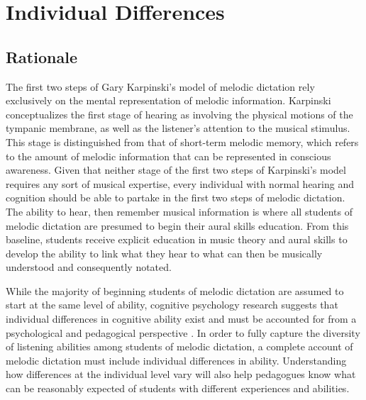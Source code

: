 \documentclass[12pt,]{book}
\begin{document}
\let\cleardoublepage\clearpage

\hypertarget{individual-differences}{%
\chapter{Individual Differences}\label{individual-differences}}

\hypertarget{rationale-1}{%
\section{Rationale}\label{rationale-1}}

The first two steps of Gary Karpinski's model of melodic dictation \citep{karpinskiAuralSkillsAcquisition2000, karpinskiModelMusicPerception1990} rely exclusively on the mental representation of melodic information.
Karpinski conceptualizes the first stage of hearing as involving the physical motions of the tympanic membrane, as well as the listener's attention to the musical stimulus.
This stage is distinguished from that of short-term melodic memory, which refers to the amount of melodic information that can be represented in conscious awareness.
Given that neither stage of the first two steps of Karpinski's model requires any sort of musical expertise, every individual with normal hearing and cognition should be able to partake in the first two steps of melodic dictation.
The ability to hear, then remember musical information is where all students of melodic dictation are presumed to begin their aural skills education.
From this baseline, students receive explicit education in music theory and aural skills to develop the ability to link what they hear to what can then be musically understood and consequently notated.

While the majority of beginning students of melodic dictation are assumed to start at the same level of ability, cognitive psychology research suggests that individual differences in cognitive ability exist and must be accounted for from a psychological and pedagogical perspective \citep{cowanWorkingMemoryCapacity2005, ritchieIntelligenceAllThat2015}.
In order to fully capture the diversity of listening abilities among students of melodic dictation, a complete account of melodic dictation must include individual differences in ability.
Understanding how differences at the individual level vary will also help pedagogues know what can be reasonably expected of students with different experiences and abilities.
\end{document}

